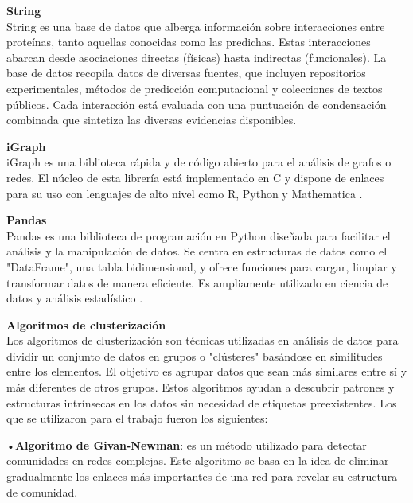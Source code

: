 \textbf{String}\\
String es una base de datos que alberga información sobre interacciones entre proteínas, tanto aquellas conocidas como las predichas. Estas interacciones abarcan desde asociaciones directas (físicas) hasta indirectas (funcionales). La base de datos recopila datos de diversas fuentes, que incluyen repositorios experimentales, métodos de predicción computacional y colecciones de textos públicos. Cada interacción está evaluada con una puntuación de condensación combinada que sintetiza las diversas evidencias disponibles\cite{Szklarczyk2021}.

\vspace{3pt}

\textbf{iGraph}\\
iGraph es una biblioteca rápida y de código abierto para el análisis de grafos o redes. El núcleo de esta librería está implementado en C y dispone de enlaces para su uso con lenguajes de alto nivel como R, Python y Mathematica \cite{Csardi2006}.

\vspace{3pt}

\textbf{Pandas}\\
Pandas es una biblioteca de programación en Python diseñada para facilitar el análisis y la manipulación de datos. Se centra en estructuras de datos como el "DataFrame", una tabla bidimensional, y ofrece funciones para cargar, limpiar y transformar datos de manera eficiente. Es ampliamente utilizado en ciencia de datos y análisis estadístico \cite{Snehkunj2022}.

\vspace{3pt}

\textbf{Algoritmos de clusterización}\\
Los algoritmos de clusterización son técnicas utilizadas en análisis de datos para dividir un conjunto de datos en grupos o "clústeres" basándose en similitudes entre los elementos. El objetivo es agrupar datos que sean más similares entre sí y más diferentes de otros grupos. Estos algoritmos ayudan a descubrir patrones y estructuras intrínsecas en los datos sin necesidad de etiquetas preexistentes. Los que se utilizaron para el trabajo fueron los siguientes:

•\textbf{Algoritmo de Givan-Newman}: es un método utilizado para detectar comunidades en redes complejas. Este algoritmo se basa en la idea de eliminar gradualmente los enlaces más importantes de una red para revelar su estructura de comunidad.

